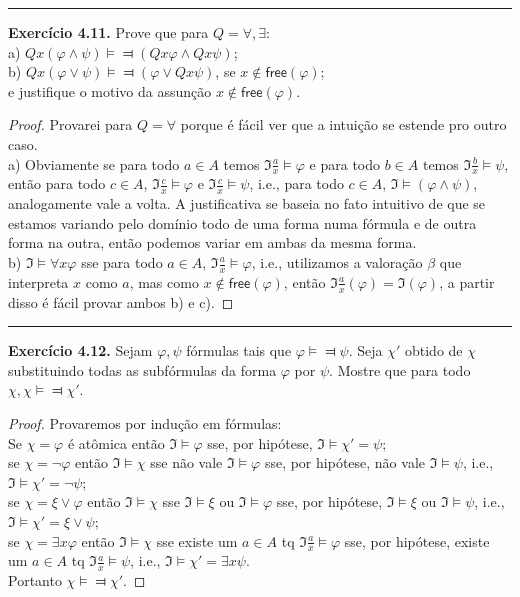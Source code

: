 \documentclass[11pt]{article}
\newcommand{\mf}[1]{\mathfrak{#1}}
\newcommand{\msf}[1]{\mathsf{#1}}
\begin{document}
\hrule

\begin{shaded}
\textbf{Exercício 4.11.} Prove que para $Q=\forall,\exists$:\\
a) $Qx(\varphi\wedge\psi)\vDash\Dashv(Qx\varphi\wedge Qx\psi)$;\\
b) $Qx(\varphi\vee\psi)\vDash\Dashv(\varphi\vee Qx\psi)$, se $x\notin\msf{free}(\varphi)$;\\
e justifique o motivo da assunção $x\notin\msf{free}(\varphi).$
\end{shaded}

\begin{proof}
    Provarei para $Q=\forall$ porque é fácil ver que a intuição se estende pro outro caso.\\
    a) Obviamente se para todo $a\in A$ temos $\mf{I}\frac{a}{x}\vDash\varphi$ e para todo $b\in A$ temos $\mf{I}\frac{b}{x}\vDash\psi$, então para todo $c\in A$, $\mf{I}\frac{c}{x}\vDash\varphi$ e $\mf{I}\frac{c}{x}\vDash\psi$, i.e., para todo $c\in A$, $\mf{I}\vDash(\varphi\wedge\psi)$, analogamente vale a volta. A justificativa se baseia no fato intuitivo de que se estamos variando pelo domínio todo de uma forma numa fórmula e de outra forma na outra, então podemos variar em ambas da mesma forma.\\
    b) $\mf{I}\vDash\forall x\varphi$ sse para todo $a\in A$, $\mf{I}\frac{a}{x}\vDash\varphi$, i.e., utilizamos a valoração $\beta$ que interpreta $x$ como $a$, mas como $x\notin\msf{free}(\varphi)$, então $\mf{I}\frac{a}{x}(\varphi)=\mf{I}(\varphi)$, a partir disso é fácil provar ambos b) e c).
\end{proof}

\hrule

\begin{shaded}
\textbf{Exercício 4.12.}
Sejam $\varphi,\psi$ fórmulas tais que $\varphi\vDash\Dashv\psi$. Seja $\chi'$ obtido de $\chi$ substituindo todas as subfórmulas da forma $\varphi$ por $\psi$. Mostre que para todo $\chi,\chi\vDash\Dashv\chi'$.
\end{shaded}

\begin{proof}
    Provaremos por indução em fórmulas:\\
    Se $\chi=\varphi$ é atômica então $\mf{I}\vDash\varphi$ sse, por hipótese, $\mf{I}\vDash\chi'=\psi$;\\
    se $\chi=\neg\varphi$ então $\mf{I}\vDash\chi$ sse não vale $\mf{I}\vDash\varphi$ sse, por hipótese, não vale $\mf{I}\vDash\psi$, i.e., $\mf{I}\vDash\chi'=\neg\psi$;\\
    se $\chi=\xi\vee\varphi$ então $\mf{I}\vDash\chi$ sse $\mf{I}\vDash\xi$ ou $\mf{I}\vDash\varphi$ sse, por hipótese, $\mf{I}\vDash\xi$ ou $\mf{I}\vDash\psi$, i.e., $\mf{I}\vDash\chi'=\xi\vee\psi$;\\
    se $\chi=\exists x\varphi$ então $\mf{I}\vDash\chi$ sse existe um $a\in A$ tq $\mf{I}\frac{a}{x}\vDash\varphi$ sse, por hipótese, existe um $a\in A$ tq $\mf{I}\frac{a}{x}\vDash\psi$, i.e., $\mf{I}\vDash\chi'=\exists x\psi$.\\
    Portanto $\chi\vDash\Dashv\chi'$.
\end{proof}
\end{document}
